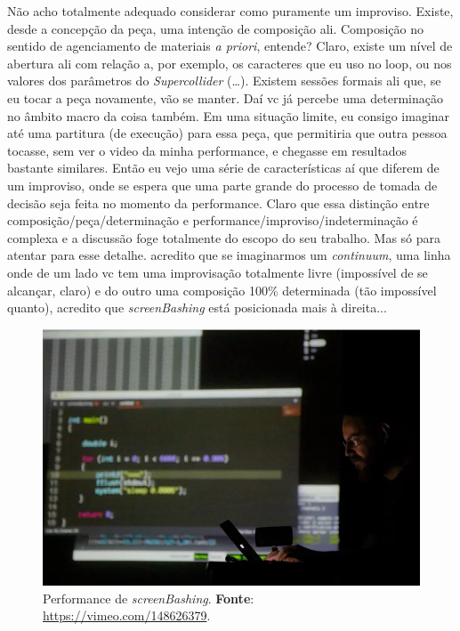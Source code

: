 \begin{citacao}
Não acho totalmente adequado considerar como puramente um improviso. Existe, desde a concepção da peça, uma intenção de composição ali. Composição no sentido de agenciamento de materiais \emph{a priori}, entende? Claro, existe um nível de abertura ali com relação a, por exemplo, os caracteres que eu uso no loop, ou nos valores dos parâmetros do \emph{Supercollider} (\ldots). Existem sessões formais ali que, se eu tocar a peça novamente, vão se manter. Daí vc já percebe uma determinação no âmbito macro da coisa também. Em uma situação limite, eu consigo imaginar até uma partitura (de execução) para essa peça, que permitiria que outra pessoa tocasse, sem ver o video da minha performance, e chegasse em resultados bastante similares. Então eu vejo uma série de características aí que diferem de um improviso, onde se espera que uma parte grande do processo de tomada de decisão seja feita no momento da performance. Claro que essa distinção entre composição/peça/determinação e performance/improviso/indeterminação é complexa e a discussão foge totalmente do escopo do seu trabalho. Mas só para atentar para esse detalhe. acredito que se imaginarmos um \emph{continuum}, uma linha onde de um lado vc tem uma improvisação totalmente livre (impossível de se alcançar, claro) e do outro uma composição 100\% determinada (tão impossível quanto), acredito que \emph{screenBashing} está posicionada mais à direita...
\end{citacao}

\begin{figure}[!h]
  \centering
  \includegraphics[scale=0.5]{imagens/screenbashing.png}
  \caption{Performance de \emph{screenBashing}. \textbf{Fonte}: \url{https://vimeo.com/148626379}.}
  \label{fig:screenbashing}
\end{figure}

